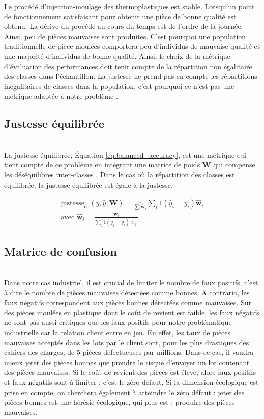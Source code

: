 Le procédé d'injection-moulage des thermoplastiques est stable.
Lorsqu'un point de fonctionnement satisfaisant pour obtenir une pièce de bonne qualité est obtenu.
La dérive du procédé au cours du temps est de l'ordre de la journée.
Ainsi, peu de pièces mauvaises sont produites.
C'est pourquoi une population traditionnelle de pièce moulées comportera peu d'individus de mauvaise qualité et une majorité d'individus de bonne qualité.
Ainsi, le choix de la métrique d'évaluation des performances doit tenir compte de la répartition non égalitaire des classes dans l'échantillon.
La justesse ne prend pas en compte les répartitions inégalitaires de classes dans la population, c'est pourquoi ce n'est pas une métrique adaptée à notre problème \cite{japkowicz_class_2002}.

\subsection{Justesse équilibrée}\mbox{} \\
La justesse équilibrée, Équation \ref{eq:balanced_accuracy}, est une métrique qui tient compte de ce problème en intégrant une matrice de poids $\mathbf{W}$ qui compense les déséquilibres inter-classes \cite{brodersen_balanced_2010, mosley_balanced_2013}.
Dans le cas où la répartition des classes est équilibrée, la justesse équilibrée est égale à la justesse.

\begin{equation} \label{eq:balanced_accuracy}
\begin{split}
\text{justesse}_{\text{éq}}(y, \hat{y}, \mathbf{W})=\frac{1}{\sum \hat{\mathbf{w}}_{i}} \sum_{i} 1\left(\hat{y}_{i}=y_{i}\right) \hat{\mathbf{w}}_{i}
\\
\text{avec } \hat{\mathbf{w}}_{i}=\frac{\mathbf{w}_{i}}{\sum_{j} 1\left(y_{j}=y_{i}\right) >_{j}}
\end{split}
\end{equation}

\subsection{Matrice de confusion}\mbox{} \\
Dans notre cas industriel, il est crucial de limiter le nombre de faux positifs, c'est à dire le nombre de pièces mauvaises détectées comme bonnes.
A contrario, les faux négatifs correspondent aux pièces bonnes détectées comme mauvaises.
Sur des pièces moulées en plastique dont le coût de revient est faible, les faux négatifs ne sont pas aussi critiques que les faux positifs pour notre problématique industrielle car la relation client entre en jeu.
En effet, les taux de pièces mauvaises acceptés dans les lots par le client sont, pour les plus drastiques des cahiers des charges, de 5 pièces défectueuses par millions.
Dans ce cas, il vaudra mieux jeter des pièces bonnes que prendre le risque d'envoyer un lot contenant des pièces mauvaises.
Si le coût de revient des pièces est élevé, alors faux positifs et faux négatifs sont à limiter : c'est le zéro défaut.
Si la dimension écologique est prise en compte, on cherchera également à atteindre le zéro défaut : jeter des pièces bonnes est une hérésie écologique, qui plus est : produire des pièces mauvaises.

